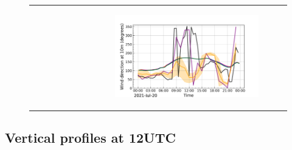 \begin{figure}[hbtp]
\begin{tabular}{cc}
\begin{subfigure}[t]{0.5\textwidth}
        \end{subfigure} &
        \begin{subfigure}[t]{0.5\textwidth}
            \caption{}
            \includegraphics[width=\textwidth]{images/chap5/IOP_TS/TS_2021-07-20_cendrosa_wind_direction_10m.png}
        \end{subfigure} \\
    \end{tabular}
    \caption{}
    \label{fig:iop_days_TS_surfvars}
\end{figure}

\clearpage

\subsection{Vertical profiles at 12UTC}


